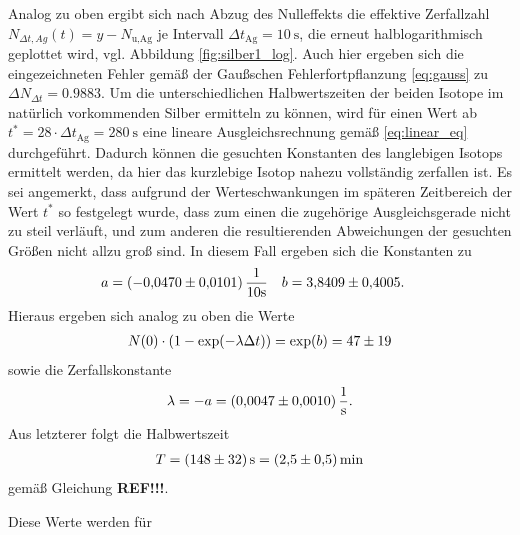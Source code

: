 \noindent
Analog zu oben ergibt sich nach Abzug des Nulleffekts die effektive Zerfallzahl 
$N_{\Delta t,Ag}(t) = y- N_\text{u,Ag}$ je Intervall $\Delta t_\text{Ag} = \qty[]{10}{\second}$,
die erneut halblogarithmisch geplottet wird, vgl. Abbildung \ref{fig:silber1_log}.
Auch hier ergeben sich die eingezeichneten Fehler gemäß der Gaußschen Fehlerfortpflanzung \eqref{eq:gauss} zu $\Delta N_{\Delta t} = \num{0.9883}$.
Um die unterschiedlichen Halbwertszeiten der beiden Isotope im natürlich vorkommenden Silber ermitteln zu können, wird für einen Wert ab 
$t^* = 28 \cdot \Delta t_\text{Ag} = \qty[]{280}{\second}$ eine lineare Ausgleichsrechnung gemäß \eqref{eq:linear_eq} durchgeführt.
Dadurch können die gesuchten Konstanten des langlebigen Isotops ermittelt werden, da hier das kurzlebige Isotop nahezu vollständig zerfallen ist.
Es sei angemerkt, dass aufgrund der Werteschwankungen im späteren Zeitbereich der Wert $t^*$ so festgelegt wurde, dass zum einen die zugehörige Ausgleichsgerade nicht zu steil verläuft,
und zum anderen die resultierenden Abweichungen der gesuchten Größen nicht allzu groß sind.
In diesem Fall ergeben sich die Konstanten zu 
\begin{align}
    a &= (\num{-0.0470 +- 0.0101}) \, \frac{1}{10 \unit{\second}}  & b &= \num{3.8409 +- 0.4005}.
\end{align}
Hieraus ergeben sich analog zu oben die Werte 
\begin{align}
    N(0) \cdot \left(1- \exp(- \lambda \Delta t)\right) = \exp(b) = \num[]{47 +- 19}
\end{align}
sowie die Zerfallskonstante 
\begin{align}
    \lambda = - a = \qty[]{0.0047 +- 0.0010}{\per\second}.
\end{align}
Aus letzterer folgt die Halbwertszeit 
\begin{align}
    T = \qty[]{148 +- 32}{\second} = \qty[]{2.5 +- 0.5}{\minute}
\end{align}
gemäß Gleichung \textbf{REF!!!}.

\noindent
Diese Werte werden für 



